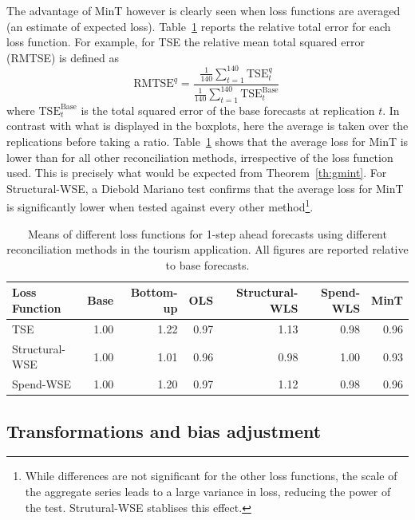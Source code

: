 \documentclass[12pt]{article}
\theoremstyle{definition}
\begin{document}
{\color{blue}

The advantage of MinT however is clearly seen when loss functions are averaged (an estimate of expected loss).  Table~\ref{tab:lossVmethods} reports the relative total error for each loss function. For example, for TSE the relative mean total squared error (RMTSE) is defined as
\begin{equation}
\textrm{RMTSE}^{q}=\frac{\frac{1}{140}\sum\limits_{t=1}^{140}\textrm{TSE}^{q}_t}{\frac{1}{140}\sum\limits_{t=1}^{140}\textrm{TSE}^{\textrm{Base}}_t}\,\label{eq:RTSE}
\end{equation}
where $\textrm{TSE}^{\textrm{Base}}_t$ is the total squared error of the base forecasts at replication $t$.  In contrast with what is displayed in the boxplots, here the average is taken over the replications before taking a ratio.  Table~\ref{tab:lossVmethods} shows that the average loss for MinT is lower than for all other reconciliation methods, irrespective of the loss function used.  This is precisely what would be expected from Theorem~\ref{th:gmint}. For Structural-WSE, a Diebold Mariano test confirms that the average loss for MinT is significantly lower when tested against every other method\footnote{{\color{blue} While differences are not significant for the other loss functions, the scale of the aggregate series leads to a large variance in loss, reducing the power of the test.  Strutural-WSE stablises this effect.}}.
}

\begin{table}[ht]
	\centering
{\color{blue}	
	\begin{tabular}{lrrrrrr}
		\hline
		Loss Function & Base & Bottom-up & OLS & Structural-WLS & Spend-WLS & MinT \\
		\hline
		TSE & 1.00 & 1.22 & 0.97 & 1.13 & 0.98 & 0.96 \\
		Structural-WSE & 1.00 & 1.01 & 0.96 & 0.98 & 1.00 & 0.93 \\
		Spend-WSE & 1.00 & 1.20 & 0.97 & 1.12 & 0.98 & 0.96 \\
		\hline
    \end{tabular}
}
	\caption{{\color{blue}Means of different loss functions for 1-step ahead forecasts using different reconciliation methods in the tourism application.  All figures are reported relative to base forecasts.}}
	\label{tab:lossVmethods}
\end{table}


\subsection{Transformations and bias adjustment}
\end{document}

